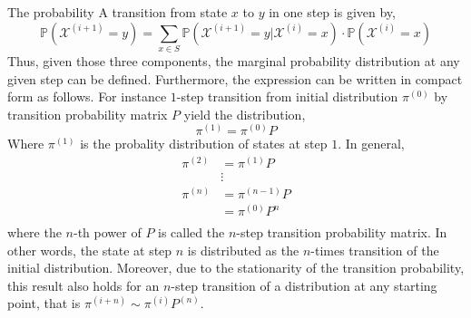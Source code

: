 The probability A transition from state $x$ to $y$ in one step is given by,
\begin{equation}
	\mathbb{P}(\mathcal{X}^{(i+1)} = y) = \sum_{x \in S} \mathbb{P}(\mathcal{X}^{(i+1)} = y | \mathcal{X}^{(i)} = x) \cdot \mathbb{P}(\mathcal{X}^{(i)} = x)
\label{eq:app_markov_chain_one_step}
\end{equation}
Thus, given those three components, the marginal probability distribution at any given step can be defined.
Furthermore, the expression can be written in compact form as follows.
For instance $1$-step transition from initial distribution $\pi^{(0)}$ by transition probability matrix $P$ yield the distribution,
\begin{equation}
	\pi^{(1)} = \pi^{(0)} P
\label{eq:app_markov_chain_one_step}
\end{equation}
Where $\pi^{(1)}$ is the probality distribution of states at step $1$.
In general,
\begin{equation}
	\begin{split}
		\pi^{(2)} & = \pi^{(1)} P \\
		          & \vdots \\
		\pi^{(n)} & = \pi^{(n-1)} P \\
		          & = \pi^{(0)} P^n\\
	\end{split}
\label{eq:app_markov_chain_one_step}
\end{equation}
where the $n$-th power of $P$ is called the $n$-step transition probability matrix.
In other words, the state at step $n$ is distributed as the $n$-times transition of the initial distribution.
Moreover, due to the stationarity of the transition probability,
this result also holds for an $n$-step transition of a distribution at any starting point,
that is $\pi^{(i+n)} \sim \pi^{(i)} P^{(n)}$.  

